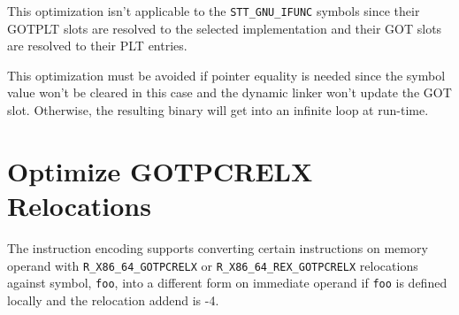 This optimization isn't applicable to the \texttt{STT_GNU_IFUNC} symbols
since their GOTPLT slots are resolved to the selected implementation and
their GOT slots are resolved to their PLT entries.

This optimization must be avoided if pointer equality is needed since
the symbol value won't be cleared in this case and the dynamic linker
won't update the GOT slot.  Otherwise, the resulting binary will get
into an infinite loop at run-time.

\section{Optimize GOTPCRELX Relocations}
\label{opt_gotpcrelx}

The \xARCH instruction encoding supports converting certain instructions
on memory operand with \texttt{R_X86_64_GOTPCRELX} or
\texttt{R_X86_64_REX_GOTPCRELX} relocations against symbol, \texttt{foo},
into a different form on immediate operand if \texttt{foo} is defined
locally and the relocation addend is -4.

